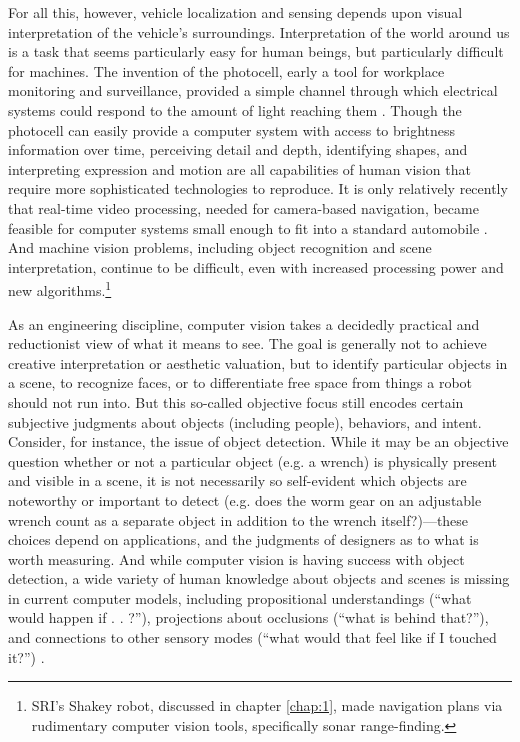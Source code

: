 For all this, however, vehicle localization and sensing depends upon
visual interpretation of the vehicle's surroundings. Interpretation of
the world around us is a task that seems
particularly easy for human beings, but particularly difficult for
machines. The invention of the photocell, early a tool for workplace
monitoring and surveillance, provided a simple channel through which
electrical systems could respond to the amount of light reaching
them \cite[p. 44]{faxed} \cite[p. 361]{nyeElectrifying}. Though the photocell can easily
provide a computer system 
with access to brightness information over time, perceiving detail and
depth, identifying shapes, and interpreting expression and motion are
all capabilities of human vision that require more sophisticated
technologies to reproduce. It is only relatively recently that real-time video
processing, needed for camera-based navigation, became feasible for computer
systems small enough to fit into a standard automobile \cite{vamors-p}. And machine
vision problems, including object recognition and scene
interpretation, continue to be difficult, even with increased
processing power and new algorithms.\footnote{SRI's Shakey robot,
  discussed in chapter \ref{chap:1}, made navigation
  plans via rudimentary computer vision tools, specifically sonar range-finding.}

As an engineering discipline, computer vision takes a decidedly
practical and reductionist view of what it means to see. The goal is
generally not to achieve creative interpretation or aesthetic
valuation, but to identify particular objects in a scene, to recognize
faces, or to differentiate free space from things a robot should
not run into. But this so-called objective focus still encodes
certain subjective judgments about objects (including people),
behaviors, and intent. Consider, for instance, the issue of object
detection. While it may be an objective question whether or not a
particular object (e.g. a wrench) is physically present and visible in
a scene, it is not
necessarily so self-evident which objects are noteworthy or important
to detect (e.g. does the worm gear on an adjustable wrench count as a
separate object in addition
to the wrench itself?)---these choices depend on applications, and the judgments of
designers as to what is worth measuring. And while computer vision is having success
with object detection, a wide variety of human knowledge
about objects and scenes is missing in current computer
models, including propositional understandings (``what would happen if
. . ?''), projections about occlusions (``what is behind that?''), and
connections to other sensory modes (``what would that feel like if I
touched it?'') \cite{gomesJordan}.

